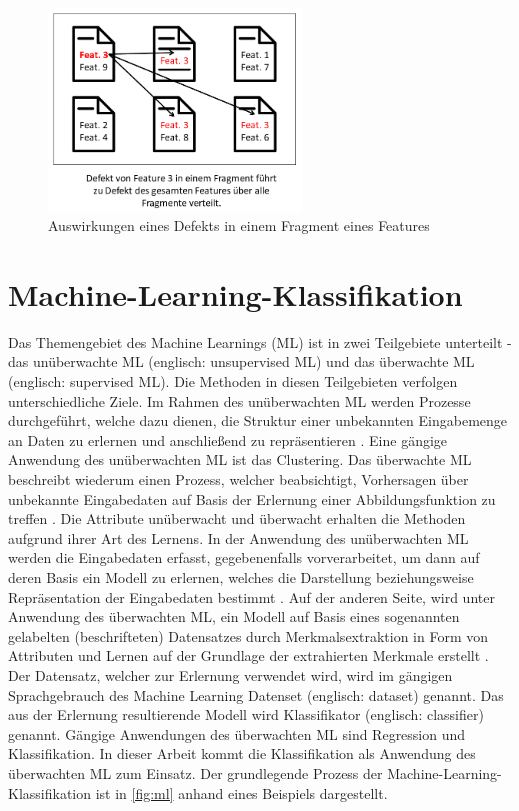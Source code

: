 \begin{figure}[t]
    \centering
    \includegraphics[width=0.6\textwidth]{images/Crosscutting}
    \caption{Auswirkungen eines Defekts in einem Fragment eines Features\label{fig:cross-cutting}}
\end{figure}

\section{Machine-Learning-Klassifikation}
\label{classification}

Das Themengebiet des Machine Learnings (ML) ist in zwei Teilgebiete unterteilt - das unüberwachte ML (englisch: unsupervised ML) und das überwachte ML (englisch: supervised ML). Die Methoden in diesen Teilgebieten verfolgen unterschiedliche Ziele. Im Rahmen des unüberwachten ML werden Prozesse durchgeführt, welche dazu dienen, die Struktur einer unbekannten Eingabemenge an Daten zu erlernen und anschließend zu repräsentieren \cite{Sammut2017}. Eine gängige Anwendung des unüberwachten ML ist das Clustering. Das überwachte ML beschreibt wiederum einen Prozess, welcher beabsichtigt, Vorhersagen über unbekannte Eingabedaten auf Basis der Erlernung einer Abbildungsfunktion zu treffen \cite{Sammut2017}. Die Attribute \glqq unüberwacht\grqq{} und \glqq überwacht\grqq{} erhalten die Methoden aufgrund ihrer Art des Lernens. In der Anwendung des unüberwachten ML werden die Eingabedaten erfasst, gegebenenfalls vorverarbeitet, um dann auf deren Basis ein Modell zu erlernen, welches die Darstellung beziehungsweise Repräsentation der Eingabedaten bestimmt \cite{Alpaydin2010}. Auf der anderen Seite, wird unter Anwendung des überwachten ML, ein Modell auf Basis eines sogenannten \glqq gelabelten\grqq{} (beschrifteten) Datensatzes durch Merkmalsextraktion in Form von Attributen und Lernen auf der Grundlage der extrahierten Merkmale erstellt \cite{Alpaydin2010}. Der Datensatz, welcher zur Erlernung verwendet wird, wird im gängigen Sprachgebrauch des Machine Learning Datenset (englisch: dataset) genannt. Das aus der Erlernung resultierende Modell wird Klassifikator (englisch: classifier) genannt. Gängige Anwendungen des überwachten ML sind Regression und Klassifikation. In dieser Arbeit kommt die Klassifikation als Anwendung des überwachten ML zum Einsatz. Der grundlegende Prozess der Machine-Learning-Klassifikation ist in \autoref{fig:ml} anhand eines Beispiels dargestellt.


